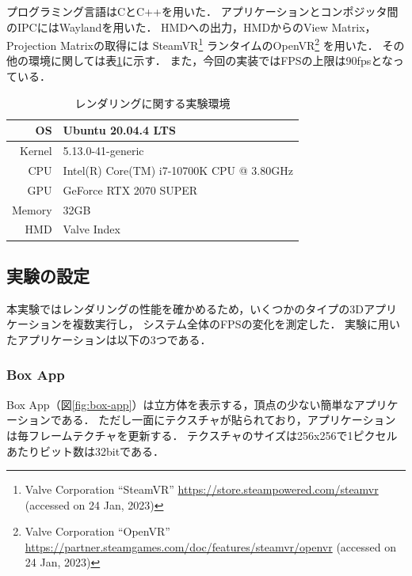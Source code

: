 プログラミング言語はCとC++を用いた．
アプリケーションとコンポジッタ間のIPCにはWaylandを用いた．
HMDへの出力，HMDからのView Matrix，Projection Matrixの取得には
SteamVR\footnote{Valve Corporation ``SteamVR'' \url{https://store.steampowered.com/steamvr} (accessed on 24 Jan, 2023)}
ランタイムのOpenVR\footnote{Valve Corporation ``OpenVR'' \url{https://partner.steamgames.com/doc/features/steamvr/openvr} (accessed on 24 Jan, 2023)}
を用いた．
その他の環境に関しては表\ref{table:rendering-env}に示す．
また，今回の実装ではFPSの上限は90fpsとなっている．

\begin{table}[htbp]
  \centering
  \begin{tabular}{|r||l|}
    \hline
    OS     & Ubuntu 20.04.4 LTS                        \\
    \hline
    Kernel & 5.13.0-41-generic                         \\
    \hline
    CPU    & Intel(R) Core(TM) i7-10700K CPU @ 3.80GHz \\
    \hline
    GPU    & GeForce RTX 2070 SUPER                    \\
    \hline
    Memory & 32GB                                      \\
    \hline
    HMD    & Valve Index                               \\
    \hline
  \end{tabular}
  \caption{レンダリングに関する実験環境}
  \label{table:rendering-env}
\end{table}

\subsection{実験の設定}

本実験ではレンダリングの性能を確かめるため，いくつかのタイプの3Dアプリケーションを複数実行し，
システム全体のFPSの変化を測定した．
実験に用いたアプリケーションは以下の3つである．

\subsubsection*{Box App}

Box App（図\ref{fig:box-app}）は立方体を表示する，頂点の少ない簡単なアプリケーションである．
ただし一面にテクスチャが貼られており，アプリケーションは毎フレームテクチャを更新する．
テクスチャのサイズは256x256で1ピクセルあたりビット数は32bitである．

